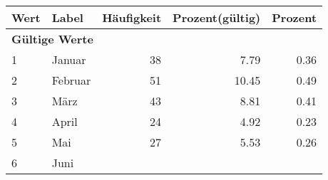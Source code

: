      \begin{longtable}{lXrrr}
     \toprule
     \textbf{Wert} & \textbf{Label} & \textbf{Häufigkeit} & \textbf{Prozent(gültig)} & \textbf{Prozent} \\
     \endhead
     \midrule
     \multicolumn{5}{l}{\textbf{Gültige Werte}}\\

     1 &
     \multicolumn{1}{X}{ Januar   } &


       \num{38} &
       \num[round-mode=places,round-precision=2]{7,79} &
         \num[round-mode=places,round-precision=2]{0,36} \\

     2 &
     \multicolumn{1}{X}{ Februar   } &


       \num{51} &
       \num[round-mode=places,round-precision=2]{10,45} &
         \num[round-mode=places,round-precision=2]{0,49} \\

     3 &
     \multicolumn{1}{X}{ März   } &


       \num{43} &
       \num[round-mode=places,round-precision=2]{8,81} &
         \num[round-mode=places,round-precision=2]{0,41} \\

     4 &
     \multicolumn{1}{X}{ April   } &


       \num{24} &
       \num[round-mode=places,round-precision=2]{4,92} &
         \num[round-mode=places,round-precision=2]{0,23} \\

     5 &
     \multicolumn{1}{X}{ Mai   } &


       \num{27} &
       \num[round-mode=places,round-precision=2]{5,53} &
         \num[round-mode=places,round-precision=2]{0,26} \\

     6 &
     \multicolumn{1}{X}{ Juni   } &



\end{longtable}
